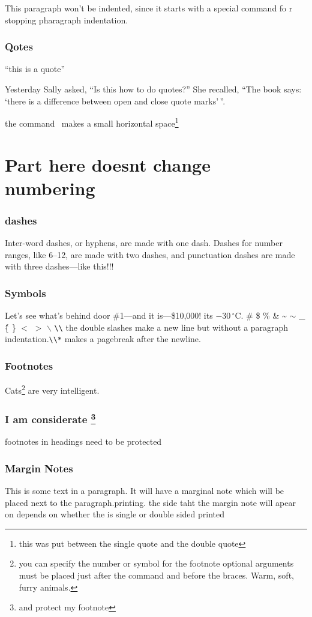 \documentclass[12pt,twoside,leqno]{article}%
\begin{document}
\noindent This paragraph won't be indented, since it starts with a special command fo r stopping pharagraph indentation. 
\section{Qotes}
``this is a quote''

Yesterday Sally asked, ``Is this how to do quotes?'' She recalled, ``The book says: `there is a difference between open and close quote marks'\,''.

the command \, makes a small horizontal space\footnote{this was put between the single quote and the double quote}
\part{Part here doesnt change numbering}
\section{dashes}
Inter-word dashes, or hyphens, are made with one dash. Dashes for number ranges, like 6--12, are made with two dashes, and punctuation dashes are made with three dashes---like this!!!
\section{Symbols}Let's see what's behind door \#1---and it is---\$10,000!
its $-30\,^{\circ}\mathrm{C}$.
\# \$ \% \& \~{} $\sim$ \_ \^ \{ \} $<$ $>$ $\backslash$ \verb!\\! the double slashes make a new line but without a paragraph indentation.\verb!\\*! makes a pagebreak after the newline.
\section{Footnotes}
Cats\footnote[5]{you can specify the number or symbol for the footnote optional arguments must be placed just after the command and before the braces. Warm, soft, furry animals.} are very intelligent.
\section{I am considerate \protect\footnote{and protect my footnote}}
footnotes in headings need to be protected
\section{Margin Notes}
This is some text in a paragraph. It will have a marginal note\normalmarginpar {} which will be placed next to the paragraph.printing.\reversemarginpar{} the side taht the margin note will apear on depends on whether the is single or double sided printed
\end{document}
